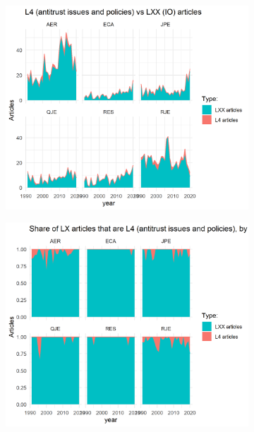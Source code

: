 \documentclass[11pt, letterpaper, twoside]{article}
\begin{document}
\begin{figure}
    \begin{subfigure}[h]{0.49\textwidth}
        \centering
        \includegraphics[width=\textwidth]{L4-vs-LXX-by-journal.png}
    \end{subfigure}
    \hfill
    \begin{subfigure}[h]{0.49\textwidth}
        \centering
        \includegraphics[width=\textwidth]{L4-vs-LXX-normalized-by_journal.png}
    \end{subfigure}
\end{figure}
\end{document}
